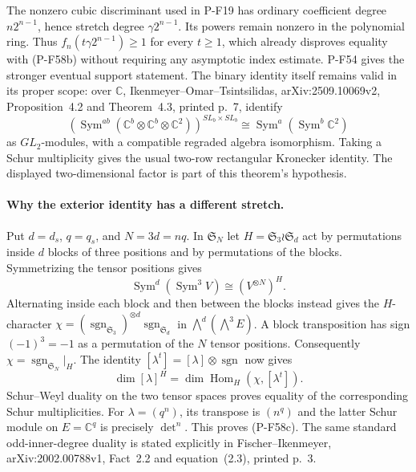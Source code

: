 The nonzero cubic discriminant used in P-F19 has ordinary
coefficient degree $n2^{n-1}$, hence stretch degree
$\gamma2^{n-1}$.  Its powers remain nonzero in the polynomial
ring.  Thus $f_n(t\gamma2^{n-1})\ge1$ for every $t\ge1$,
which already disproves equality with (P-F58b) without
requiring any asymptotic index estimate.  P-F54 gives the
stronger eventual support statement.  The binary identity
itself remains valid in its proper scope: over $\mathbb C$,
Ikenmeyer--Omar--Tsintsilidas, arXiv:2509.10069v2,
Proposition~4.2 and Theorem~4.3, printed p.~7, identify
\[
 \left(\operatorname{Sym}^{ab}
          (\mathbb C^b\otimes\mathbb C^b\otimes\mathbb C^2)
       \right)^{SL_b\times SL_b}
       \cong\operatorname{Sym}^{a}
                       (\operatorname{Sym}^{b}\mathbb C^2)
                                                        \tag{P-F58g}
\]
as $GL_2$-modules, with a compatible regraded algebra
isomorphism.  Taking a Schur multiplicity gives the usual
two-row rectangular Kronecker identity.  The displayed
two-dimensional factor is part of this theorem's hypothesis.

\paragraph{Why the exterior identity has a different stretch.}
Put $d=d_s$, $q=q_s$, and $N=3d=nq$.  In
$\mathfrak S_N$ let $H=\mathfrak S_3\wr\mathfrak S_d$ act
by permutations inside $d$ blocks of three positions and by
permutations of the blocks.  Symmetrizing the tensor positions
gives
\[
 \operatorname{Sym}^{d}(\operatorname{Sym}^3 V)
                       \cong (V^{\otimes N})^H.
\]
Alternating inside each block and then between the blocks
instead gives the $H$-character
$\chi=(\operatorname{sgn}_{\mathfrak S_3})^{\otimes d}
          \operatorname{sgn}_{\mathfrak S_d}$ in
$\bigwedge^d(\bigwedge^3 E)$.  A block transposition has
sign $(-1)^3=-1$ as a permutation of the $N$ tensor positions.
Consequently $\chi=\operatorname{sgn}_{\mathfrak S_N}|_H$.
The identity $[\lambda^t]=[\lambda]\otimes\operatorname{sgn}$
now gives
\[
 \dim[\lambda]^H
       =\dim\operatorname{Hom}_{H}(\chi,[\lambda^t]).
\]
Schur--Weyl duality on the two tensor spaces proves equality
of the corresponding Schur multiplicities.  For
$\lambda=(q^n)$, its transpose is $(n^q)$ and the latter
Schur module on $E=\mathbb C^q$ is precisely $\det^n$.
This proves (P-F58c).  The same standard odd-inner-degree
duality is stated explicitly in Fischer--Ikenmeyer,
arXiv:2002.00788v1, Fact~2.2 and equation~(2.3), printed p.~3.

